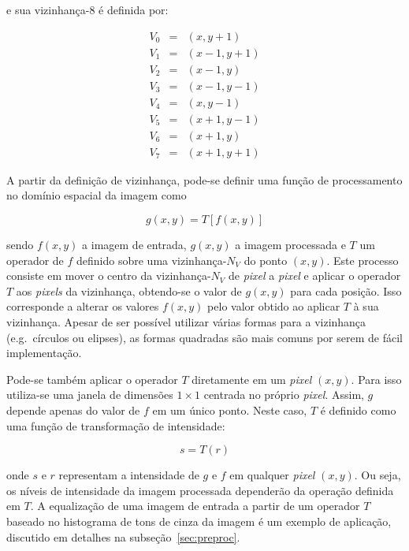 \noindent e sua vizinhança-8 é definida por:

\begin{eqnarray}
  V_0 & = & (x, y+1) \\
  V_1 & = & (x-1, y+1) \\
  V_2 & = & (x-1, y) \\
  V_3 & = & (x-1, y-1) \\
  V_4 & = & (x, y-1) \\
  V_5 & = & (x+1, y-1) \\
  V_6 & = & (x+1, y) \\
  V_7 & = & (x+1, y+1)
\end{eqnarray}

A partir da definição de vizinhança, pode-se definir uma função de
processamento no domínio espacial da imagem como

\begin{equation}
  g(x,y) = T[f(x,y)]
  \label{eq:fproc}
\end{equation}

\noindent sendo $f(x,y)$ a imagem de entrada, $g(x,y)$ a imagem
processada e $T$ um operador de $f$ definido sobre uma
vizinhança-$N_V$ do ponto $(x,y)$. Este processo consiste em mover o
centro da vizinhança-$N_V$ de \textit{pixel} a \textit{pixel} e aplicar o operador $T$
aos \textit{pixels} da vizinhança, obtendo-se o valor de $g(x,y)$ para cada
posição. Isso corresponde a alterar os valores $f(x,y)$ pelo valor
obtido ao aplicar $T$ à sua vizinhança. Apesar de ser possível
utilizar várias formas para a vizinhança (e.g.\ círculos ou elipses),
as formas quadradas são mais comuns por serem de fácil
implementação.~\cite{gonzalez}

Pode-se também aplicar o operador $T$ diretamente em um \textit{pixel}
$(x,y)$. Para isso utiliza-se uma janela de dimensões $1 \times 1$
centrada no próprio \textit{pixel}. Assim, $g$ depende apenas do valor de $f$
em um único ponto. Neste caso, $T$ é definido como uma função de
transformação de intensidade:

\begin{equation}
  s = T(r)
\end{equation} 

\noindent onde $s$ e $r$ representam a intensidade de $g$ e $f$ em qualquer \textit{pixel} $(x,y)$. 
Ou seja, os níveis de intensidade da imagem processada dependerão da
operação definida em $T$. A equalização de uma imagem de entrada a
partir de um operador $T$ baseado no histograma de tons de cinza da
imagem é um exemplo de aplicação, discutido em detalhes na
subseção~\ref{sec:preproc}.

